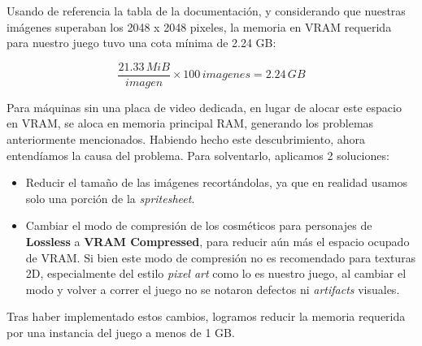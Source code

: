 Usando de referencia la tabla de la documentación, y considerando que nuestras imágenes superaban
los 2048 x 2048 pixeles, la memoria en VRAM requerida para nuestro juego tuvo una cota mínima de 
2.24 GB:

\[
\frac{21.33 \, MiB}{imagen} \times 100 \, imagenes = 2.24 \, GB
\]

Para máquinas sin una placa de video dedicada, en lugar de alocar este espacio en VRAM, se aloca
en memoria principal RAM, generando los problemas anteriormente mencionados.
Habiendo hecho este descubrimiento, ahora entendíamos la causa del problema. Para solventarlo,
aplicamos 2 soluciones:

\begin{itemize}
    \item Reducir el tamaño de las imágenes recortándolas, ya que en realidad usamos solo
    una porción de la \textit{spritesheet}.
    \item Cambiar el modo de compresión de los cosméticos para personajes de \textbf{Lossless}
    a \textbf{VRAM Compressed}, para reducir aún más el espacio ocupado de VRAM. Si bien este
    modo de compresión no es recomendado para texturas 2D, especialmente del estilo
    \textit{pixel art} como lo es nuestro juego, al cambiar el modo y volver a correr el juego
    no se notaron defectos ni \textit{artifacts} visuales.
\end{itemize}

Tras haber implementado estos cambios, logramos reducir la memoria requerida por una instancia
del juego a menos de 1 GB.
